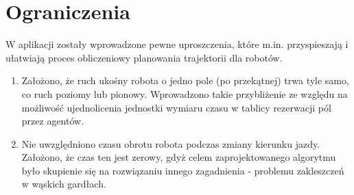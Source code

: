 \section{Ograniczenia}
W aplikacji zostały wprowadzone pewne uproszczenia, które m.in. przyspieszają i ułatwiają proces obliczeniowy planowania trajektorii dla robotów.
\begin{enumerate}
	\item Założono, że ruch ukośny robota o jedno pole (po przekątnej) trwa tyle samo, co ruch poziomy lub pionowy. Wprowadzono takie przybliżenie ze względu na możliwość ujednolicenia jednostki wymiaru czasu w tablicy rezerwacji pól przez agentów.
	\item Nie uwzględniono czasu obrotu robota podczas zmiany kierunku jazdy. Założono, że czas ten jest zerowy, gdyż celem zaprojektowanego algorytmu było skupienie się na rozwiązaniu innego zagadnienia - problemu zakleszczeń w wąskich gardłach.
\end{enumerate}
